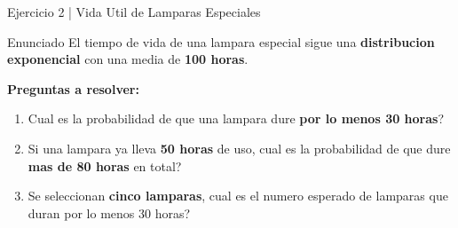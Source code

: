 \documentclass[10pt]{beamer}
\begin{document}
\begin{frame}{Ejercicio 2 | Vida Util de Lamparas Especiales}
\begin{block}{Enunciado}
\justifying
El tiempo de vida de una lampara especial sigue una \textbf{distribucion exponencial} con una media de \textbf{100 horas}.
\end{block}

\vspace{0.2cm}
\textbf{Preguntas a resolver:}
\begin{enumerate}
    \item Cual es la probabilidad de que una lampara dure \textbf{por lo menos 30 horas}?
    \item Si una lampara ya lleva \textbf{50 horas} de uso, cual es la probabilidad de que dure \textbf{mas de 80 horas} en total?
    \item Se seleccionan \textbf{cinco lamparas}, cual es el numero esperado de lamparas que duran por lo menos 30 horas?
\end{enumerate}

\vspace{0.2cm}
\begin{center}
\end{center}
\end{frame}
\end{document}
